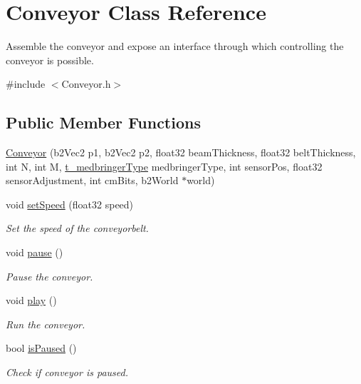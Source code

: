 \hypertarget{classConveyor}{\section{Conveyor Class Reference}
\label{classConveyor}
}


Assemble the conveyor and expose an interface through which controlling the conveyor is possible.  




{\ttfamily \#include $<$Conveyor.\-h$>$}

\subsection*{Public Member Functions}
\begin{DoxyCompactItemize}
\item 
\hyperlink{classConveyor_a49aeaaa057ce5bbce9d0dbd8efcd86cf}{Conveyor} (b2\-Vec2 p1, b2\-Vec2 p2, float32 beam\-Thickness, float32 belt\-Thickness, int N, int M, \hyperlink{Conveyor_8h_a98261db3679be2885c0bdad13c27d7b1}{t\-\_\-medbringer\-Type} medbringer\-Type, int sensor\-Pos, float32 sensor\-Adjustment, int cm\-Bits, b2\-World $\ast$world)
\item 
void \hyperlink{classConveyor_a2c161757c96058a1af3225192db4add6}{set\-Speed} (float32 speed)
\begin{DoxyCompactList}\small\item\em Set the speed of the conveyorbelt. \end{DoxyCompactList}\item 
void \hyperlink{classConveyor_a85ac6c349c3a15e57279c5138da2cfed}{pause} ()
\begin{DoxyCompactList}\small\item\em Pause the conveyor. \end{DoxyCompactList}\item 
void \hyperlink{classConveyor_a50cae15e0bb0f744297ce51651ad26f2}{play} ()
\begin{DoxyCompactList}\small\item\em Run the conveyor. \end{DoxyCompactList}\item 
bool \hyperlink{classConveyor_a3d97165f61dd8b1f1d27214dce8383df}{is\-Paused} ()
\begin{DoxyCompactList}\small\item\em Check if conveyor is paused. \end{DoxyCompactList}\item 

\end{DoxyCompactItemize}
